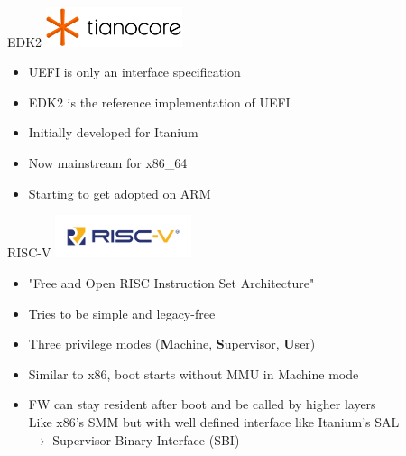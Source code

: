\documentclass[
  10pt
]{beamer}
\begin{document}

\begin{frame}{EDK2}
  \centering
  \includegraphics[width=0.3\textwidth]{resources/tianocore-logo.png}

  \vfill

  \begin{itemize}
    \item UEFI is only an interface specification
    \item EDK2 is the reference implementation of UEFI
    \item Initially developed for Itanium 
    \item Now mainstream for x86\_64
    \item Starting to get adopted on ARM %
  \end{itemize}
\end{frame}

\begin{frame}{RISC-V}
  \centering
  \includegraphics[width=0.3\textwidth]{resources/riscv-logo.png}

  \vfill

  \begin{itemize}
    \item "Free and Open RISC Instruction Set Architecture"
    \item Tries to be simple and legacy-free
    \item Three privilege modes (\textbf{M}achine, \textbf{S}upervisor, \textbf{U}ser)
    \item Similar to x86, boot starts without MMU in Machine mode
    \item FW can stay resident after boot and be called by higher layers \\
          Like x86's SMM but with well defined interface like Itanium's SAL \\
          $\rightarrow$ Supervisor Binary Interface (SBI)
  \end{itemize}
\end{frame}
\end{document}
